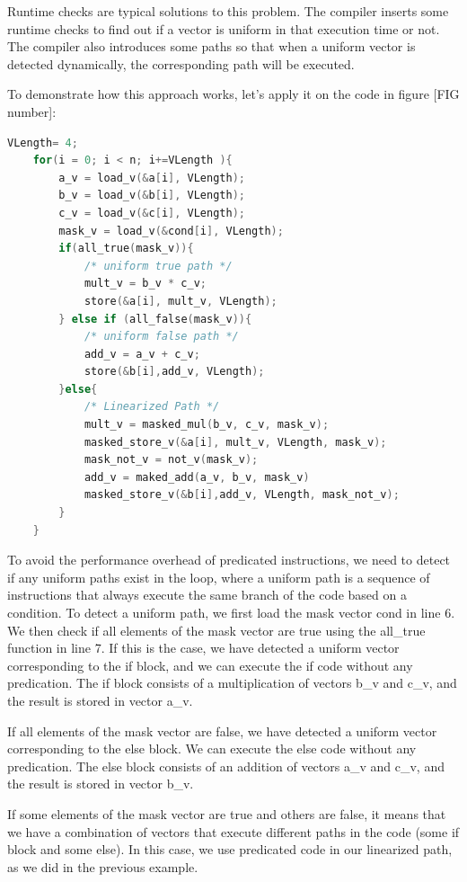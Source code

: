 \documentclass[\main/thesis.tex]{subfiles}
\begin{document}
Runtime checks are typical solutions to this problem. The compiler inserts some runtime checks to find out if a vector is uniform in that execution time or not. The compiler also introduces some paths so that when a uniform vector is detected dynamically, the corresponding path will be executed.

To demonstrate how this approach works, let's apply it on the code in figure [FIG number]:

\begin{lstlisting}[language=C]
    VLength= 4;
    for(i = 0; i < n; i+=VLength ){
        a_v = load_v(&a[i], VLength);
        b_v = load_v(&b[i], VLength);
        c_v = load_v(&c[i], VLength);
        mask_v = load_v(&cond[i], VLength);
        if(all_true(mask_v)){
            /* uniform true path */
            mult_v = b_v * c_v;
            store(&a[i], mult_v, VLength);
        } else if (all_false(mask_v)){
            /* uniform false path */
            add_v = a_v + c_v;
            store(&b[i],add_v, VLength);
        }else{
            /* Linearized Path */
            mult_v = masked_mul(b_v, c_v, mask_v);
            masked_store_v(&a[i], mult_v, VLength, mask_v);
            mask_not_v = not_v(mask_v);
            add_v = maked_add(a_v, b_v, mask_v)
            masked_store_v(&b[i],add_v, VLength, mask_not_v);
        }
    }
\end{lstlisting}

To avoid the performance overhead of predicated instructions, we need to detect if any uniform paths exist in the loop, where a uniform path is a sequence of instructions that always execute the same branch of the code based on a condition. To detect a uniform path, we first load the mask vector cond in line 6. We then check if all elements of the mask vector are true using the all\_true function in line 7. If this is the case, we have detected a uniform vector corresponding to the if block, and we can execute the if code without any predication. The if block consists of a multiplication of vectors b\_v and c\_v, and the result is stored in vector a\_v.

If all elements of the mask vector are false, we have detected a uniform vector corresponding to the else block. We can execute the else code without any predication. The else block consists of an addition of vectors a\_v and c\_v, and the result is stored in vector b\_v.

If some elements of the mask vector are true and others are false, it means that we have a combination of vectors that execute different paths in the code (some if block and some else). In this case, we use predicated code in our linearized path, as we did in the previous example.
\end{document}
